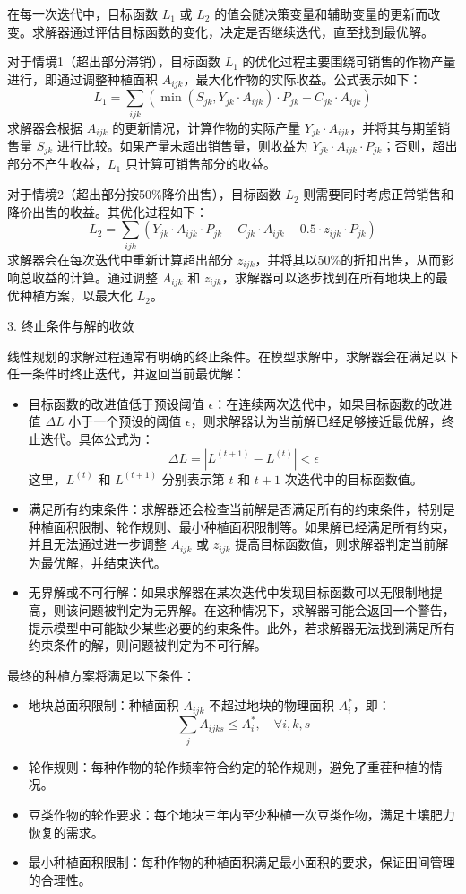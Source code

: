 \documentclass[12pt,a4paper]{nmmcm}
\begin{document}
在每一次迭代中，目标函数 $L_1$ 或 $L_2$ 的值会随决策变量和辅助变量的更新而改变。求解器通过评估目标函数的变化，决定是否继续迭代，直至找到最优解。

对于情境1（超出部分滞销），目标函数 $L_1$ 的优化过程主要围绕可销售的作物产量进行，即通过调整种植面积 $A_{ijk}$，最大化作物的实际收益。公式表示如下：
\[
L_1 = \sum_{ijk} \left( \min(S_{jk}, Y_{jk} \cdot A_{ijk}) \cdot P_{jk} - C_{jk} \cdot A_{ijk} \right)
\]
求解器会根据 $A_{ijk}$ 的更新情况，计算作物的实际产量 $Y_{jk} \cdot A_{ijk}$，并将其与期望销售量 $S_{jk}$ 进行比较。如果产量未超出销售量，则收益为 $Y_{jk} \cdot A_{ijk} \cdot P_{jk}$；否则，超出部分不产生收益，$L_1$ 只计算可销售部分的收益。

对于情境2（超出部分按50\%降价出售），目标函数 $L_2$ 则需要同时考虑正常销售和降价出售的收益。其优化过程如下：
\[
L_2 = \sum_{ijk} \left( Y_{jk} \cdot A_{ijk} \cdot P_{jk} - C_{jk} \cdot A_{ijk} - 0.5 \cdot z_{ijk} \cdot P_{jk} \right)
\]
求解器会在每次迭代中重新计算超出部分 $z_{ijk}$，并将其以50\%的折扣出售，从而影响总收益的计算。通过调整 $A_{ijk}$ 和 $z_{ijk}$，求解器可以逐步找到在所有地块上的最优种植方案，以最大化 $L_2$。

 3. 终止条件与解的收敛

线性规划的求解过程通常有明确的终止条件。在模型求解中，求解器会在满足以下任一条件时终止迭代，并返回当前最优解：
\begin{itemize}
    \item 目标函数的改进值低于预设阈值 $\epsilon$：在连续两次迭代中，如果目标函数的改进值 $\Delta L$ 小于一个预设的阈值 $\epsilon$，则求解器认为当前解已经足够接近最优解，终止迭代。具体公式为：
    \[
    \Delta L = |L^{(t+1)} - L^{(t)}| < \epsilon
    \]
    这里，$L^{(t)}$ 和 $L^{(t+1)}$ 分别表示第 $t$ 和 $t+1$ 次迭代中的目标函数值。

    \item 满足所有约束条件：求解器还会检查当前解是否满足所有的约束条件，特别是种植面积限制、轮作规则、最小种植面积限制等。如果解已经满足所有约束，并且无法通过进一步调整 $A_{ijk}$ 或 $z_{ijk}$ 提高目标函数值，则求解器判定当前解为最优解，并结束迭代。

    \item 无界解或不可行解：如果求解器在某次迭代中发现目标函数可以无限制地提高，则该问题被判定为无界解。在这种情况下，求解器可能会返回一个警告，提示模型中可能缺少某些必要的约束条件。此外，若求解器无法找到满足所有约束条件的解，则问题被判定为不可行解。
\end{itemize}

最终的种植方案将满足以下条件：
\begin{itemize}
    \item 地块总面积限制：种植面积 $A_{ijk}$ 不超过地块的物理面积 $A_i^*$，即：
    \[
    \sum_j A_{ijks} \leq A_i^*, \quad \forall i, k, s
    \]
    \item 轮作规则：每种作物的轮作频率符合约定的轮作规则，避免了重茬种植的情况。
    \item 豆类作物的轮作要求：每个地块三年内至少种植一次豆类作物，满足土壤肥力恢复的需求。
    \item 最小种植面积限制：每种作物的种植面积满足最小面积的要求，保证田间管理的合理性。
\end{itemize}
\end{document}
